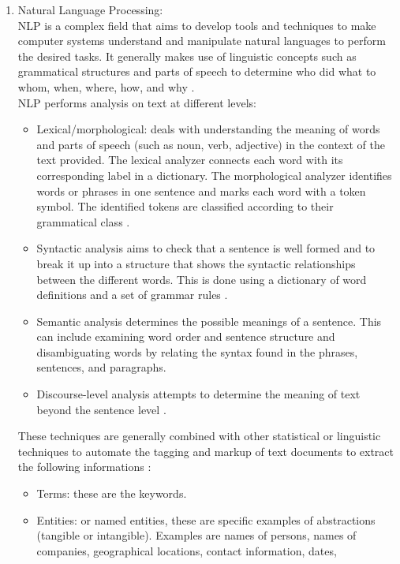 \begin{enumerate}
\item  Natural Language Processing: \\
 NLP is a complex field that aims  to develop tools and techniques to make computer systems understand and manipulate natural languages to perform the desired tasks. It generally makes use of linguistic concepts such as grammatical structures and parts of speech to determine who did what to whom, when, where, how, and why \cite{a:BigData} \cite{a:NLP}.\\
NLP performs analysis on text at different levels:
\begin{itemize}
\item Lexical/morphological:  deals with understanding the meaning of words and parts of speech (such as noun, verb, adjective) in the context of the text provided. The lexical analyzer connects each word with its corresponding label in a dictionary. The morphological analyzer identifies words or phrases in one sentence and marks each word with a token symbol. The identified tokens are classified according to their grammatical class \cite{a:analyzer http://www.sbmac.org.br/dincon/trabalhos/PDF/statistics/68066.pdf}.
\item Syntactic analysis aims to check that a sentence is well formed and to break it up into a structure that shows
the syntactic relationships between the different words. This is done using a dictionary of word definitions and a set of grammar rules \cite{a:https://www.scm.tees.ac.uk/isg/aia/nlp/NLP-overview.pdf}.
\item Semantic analysis determines the possible meanings of a sentence. This can include examining word order and sentence structure and disambiguating words by relating the syntax found in the phrases, sentences, and paragraphs.
\item Discourse-level analysis attempts to determine the meaning of text beyond the sentence level \cite{a:BigData}.
\end{itemize}
These techniques are generally combined with other statistical or linguistic techniques to automate the tagging and markup of text documents to extract the following informations \cite{a:BigData}:
\begin{itemize}
\item  Terms: these are the keywords.
\item  Entities: or named entities, these are specific examples of
abstractions (tangible or intangible). Examples are names of persons,
names of companies, geographical locations, contact information, dates,

\end{itemize}
\end{enumerate}
